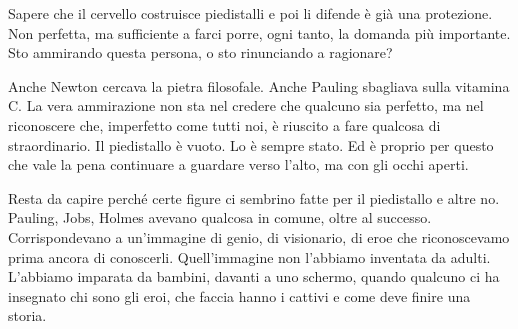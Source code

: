 Sapere che il cervello costruisce piedistalli e poi li difende \`{e} gi\`{a} una protezione. Non perfetta, ma sufficiente a farci porre, ogni tanto, la domanda pi\`{u} importante. Sto ammirando questa persona, o sto rinunciando a ragionare?

Anche Newton cercava la pietra filosofale. Anche Pauling sbagliava sulla vitamina C. La vera ammirazione non sta nel credere che qualcuno sia perfetto, ma nel riconoscere che, imperfetto come tutti noi, \`{e} riuscito a fare qualcosa di straordinario. Il piedistallo \`{e} vuoto. Lo \`{e} sempre stato. Ed \`{e} proprio per questo che vale la pena continuare a guardare verso l'alto, ma con gli occhi aperti.

Resta da capire perché certe figure ci sembrino fatte per il piedistallo e altre no. Pauling, Jobs, Holmes avevano qualcosa in comune, oltre al successo. Corrispondevano a un'immagine di genio, di visionario, di eroe che riconoscevamo prima ancora di conoscerli. Quell'immagine non l'abbiamo inventata da adulti. L'abbiamo imparata da bambini, davanti a uno schermo, quando qualcuno ci ha insegnato chi sono gli eroi, che faccia hanno i cattivi e come deve finire una storia.
